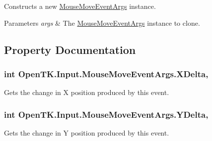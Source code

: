 Constructs a new \hyperlink{class_open_t_k_1_1_input_1_1_mouse_move_event_args}{Mouse\-Move\-Event\-Args} instance. 


\begin{DoxyParams}{Parameters}
{\em args} & The \hyperlink{class_open_t_k_1_1_input_1_1_mouse_move_event_args}{Mouse\-Move\-Event\-Args} instance to clone.\\
\hline
\end{DoxyParams}


\subsection{Property Documentation}
\hypertarget{class_open_t_k_1_1_input_1_1_mouse_move_event_args_af762d26725d6220b83e19a1999d21889}{
\subsubsection[{X\-Delta}]{\setlength{\rightskip}{0pt plus 5cm}int Open\-T\-K.\-Input.\-Mouse\-Move\-Event\-Args.\-X\-Delta\hspace{0.3cm}{\ttfamily [get]}, {\ttfamily [set]}}}\label{class_open_t_k_1_1_input_1_1_mouse_move_event_args_af762d26725d6220b83e19a1999d21889}


Gets the change in X position produced by this event. 

\hypertarget{class_open_t_k_1_1_input_1_1_mouse_move_event_args_aaef0da462fdd9aa0fd82abea2efd8687}{
\subsubsection[{Y\-Delta}]{\setlength{\rightskip}{0pt plus 5cm}int Open\-T\-K.\-Input.\-Mouse\-Move\-Event\-Args.\-Y\-Delta\hspace{0.3cm}{\ttfamily [get]}, {\ttfamily [set]}}}\label{class_open_t_k_1_1_input_1_1_mouse_move_event_args_aaef0da462fdd9aa0fd82abea2efd8687}


Gets the change in Y position produced by this event. 


